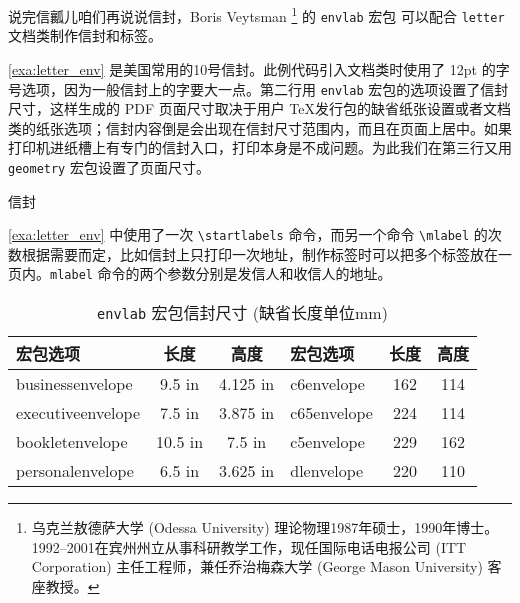 说完信瓤儿咱们再说说信封，Boris Veytsman\indexVeytsman{} \footnote{乌克兰敖德萨大学 (Odessa University) 理论物理1987年硕士，1990年博士。1992--2001在宾州州立从事科研教学工作，现任国际电话电报公司 (ITT Corporation) 主任工程师，兼任乔治梅森大学 (George Mason University) 客座教授。} 的 \texttt{envlab} 宏包 \citep{Veytsman_envlab} 可以配合 \texttt{letter} 文档类制作信封和标签。

\autoref{exa:letter_env} 是美国常用的10号信封。此例代码引入文档类时使用了 12pt 的字号选项，因为一般信封上的字要大一点。第二行用 \texttt{envlab} 宏包的选项设置了信封尺寸，这样生成的 PDF 页面尺寸取决于用户 \TeX 发行包的缺省纸张设置或者文档类的纸张选项；信封内容倒是会出现在信封尺寸范围内，而且在页面上居中。如果打印机进纸槽上有专门的信封入口，打印本身是不成问题。为此我们在第三行又用 \texttt{geometry} 宏包设置了页面尺寸。

\begin{example}[htbp]
\caption{信封}
\label{exa:letter_env}
\end{example}

\autoref{exa:letter_env} 中使用了一次 \verb|\startlabels| 命令，而另一个命令 \verb|\mlabel| 的次数根据需要而定，比如信封上只打印一次地址，制作标签时可以把多个标签放在一页内。\verb|mlabel| 命令的两个参数分别是发信人和收信人的地址。

\begin{table}[htbp]
\centering
\caption{\texttt{envlab} 宏包信封尺寸 (缺省长度单位mm)}
\label{tab:env_sizes}
\begin{tabular}{lcclcc}
  \toprule
  宏包选项           & 长度    & 高度     & 宏包选项     & 长度   & 高度\\
  \midrule
  businessenvelope  & 9.5 in  & 4.125 in & c6envelope  & 162 & 114\\
  executiveenvelope & 7.5 in  & 3.875 in & c65envelope & 224 & 114\\
  bookletenvelope   & 10.5 in & 7.5 in   & c5envelope  & 229 & 162\\
  personalenvelope  & 6.5 in  & 3.625 in & dlenvelope  & 220 & 110\\ 
  \bottomrule
\end{tabular}
\end{table}

